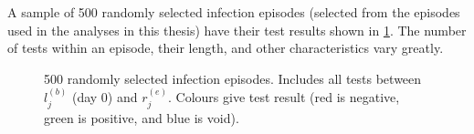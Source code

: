 \documentclass[thesis.tex]{subfiles}
\begin{document}
A sample of 500 randomly selected infection episodes (selected from the episodes used in the analyses in this thesis) have their test results shown in \cref{biology-data:fig:episodes}.
The number of tests within an episode, their length, and other characteristics vary greatly.
\begin{figure}
  \vspace{-1cm}
  \caption[CIS infection episodes]{%
    500 randomly selected infection episodes.
    Includes all tests between $l_j^{(b)}$ (day 0) and $r_j^{(e)}$.
    Colours give test result (red is negative, green is positive, and blue is void).
  }
  \label{biology-data:fig:episodes}
\end{figure}
\end{document}
